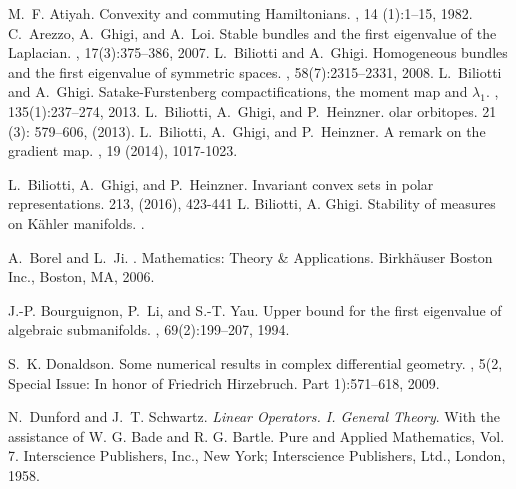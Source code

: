 \documentclass[leqno,11pt, a4]{amsart}
\theoremstyle{named}
\begin{document}
\begin{thebibliography}{10}
 M.~F. Atiyah.  \newblock Convexity and
  commuting {H}amiltonians.  ,
  14 (1):1--15, 1982.
 C.~Arezzo, A.~Ghigi, and A.~Loi.
\newblock
  Stable bundles and the first eigenvalue of the {L}aplacian.
  , 17(3):375--386, 2007.
 L.~Biliotti and A.~Ghigi.  \newblock
  Homogeneous bundles and the first eigenvalue of symmetric spaces.
  , 58(7):2315--2331,
  2008.
 L.~Biliotti and A.~Ghigi.  \newblock
  Satake-{F}urstenberg compactifications, the moment map and
  {$\lambda_1$}.  , 135(1):237--274,
  2013.
 L.~Biliotti, A.~Ghigi, and
  P.~Heinzner.  olar orbitopes.   21 (3): 579--606, (2013).
 L.~Biliotti, A.~Ghigi, and P.~Heinzner.  \newblock A
  remark on the gradient map.
, 19 (2014), 1017-1023.

 L.~Biliotti, A.~Ghigi, and P.~Heinzner.
  \newblock Invariant convex sets in polar representations.
   213, (2016), 423-441
 L. Biliotti, A. Ghigi.
Stability of measures on K\"ahler manifolds.
.

 A.~Borel and L.~Ji.  .
  \newblock Mathematics: Theory \& Applications. Birkh\"auser Boston
  Inc., Boston, MA, 2006.

 J.-P. Bourguignon, P.~Li, and S.-T. Yau.
  \newblock Upper bound for the first eigenvalue of algebraic
  submanifolds.  , 69(2):199--207,
  1994.

 S.~K. Donaldson.  \newblock Some
  numerical results in complex differential geometry.  , 5(2, Special Issue: In honor of Friedrich
  Hirzebruch. Part 1):571--618, 2009.

 N.~Dunford and J.~T. Schwartz.  \newblock
  {\em Linear {O}perators. {I}. {G}eneral {T}heory}.  \newblock With
  the assistance of W. G. Bade and R. G. Bartle. Pure and Applied
  Mathematics, Vol. 7. Interscience Publishers, Inc., New York;
  Interscience Publishers, Ltd., London, 1958.


\end{thebibliography}
\end{document}
